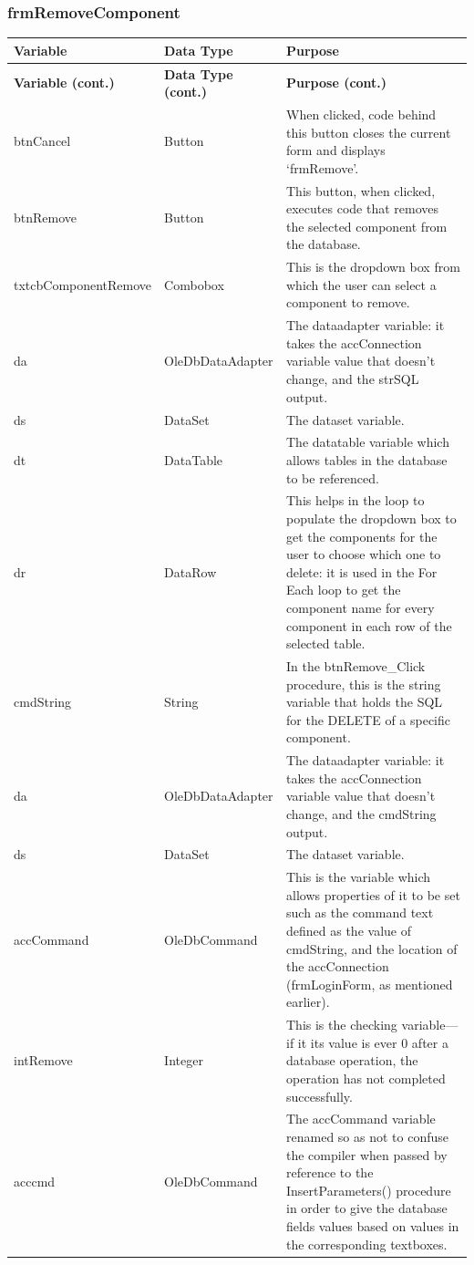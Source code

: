 	\subsubsection{frmRemoveComponent}
	\begin{longtable}{| p{4cm} | p{3cm} | p{10cm} |}
		\hline
		\textbf{Variable} & \textbf{Data Type} & \textbf{Purpose}\\
		\endfirsthead
		\hline
		\textbf{Variable (cont.)} & \textbf{Data Type (cont.)} & \textbf{Purpose (cont.)}\\
		\endhead
		\hline
		btnCancel & Button & When clicked, code behind this button closes the current form and displays `frmRemove'.\\
		\hline
		btnRemove & Button & This button, when clicked, executes code that removes the selected component from the database.\\
		\hline
		txtcbComponentRemove & Combobox & This is the dropdown box from which the user can select a component to remove.\\
		\hline
		da & OleDbDataAdapter & The dataadapter variable: it takes the accConnection variable value that doesn't change, and the strSQL output.\\
		\hline
		ds & DataSet & The dataset variable.\\
		\hline
		dt & DataTable & The datatable variable which allows tables in the database to be referenced.\\
		\hline
		dr & DataRow & This helps in the loop to populate the dropdown box to get the components for the user to choose which one to delete: it is used in the For Each loop to get the component name for every component in each row of the selected table.\\
		\hline
		cmdString & String & In the btnRemove\_Click procedure, this is the string variable that holds the SQL for the DELETE of a specific component.\\
		\hline
		da & OleDbDataAdapter & The dataadapter variable: it takes the accConnection variable value that doesn't change, and the cmdString output.\\
		\hline
		ds & DataSet & The dataset variable.\\
		\hline
		accCommand & OleDbCommand & This is the variable which allows properties of it to be set such as the command text defined as the value of cmdString, and the location of the accConnection (frmLoginForm, as mentioned earlier).\\
		\hline
		intRemove & Integer & This is the checking variable---if it its value is ever 0 after a database operation, the operation has not completed successfully.\\
		\hline
		acccmd & OleDbCommand & The accCommand variable renamed so as not to confuse the compiler when passed by reference to the InsertParameters() procedure in order to give the database fields values based on values in the corresponding textboxes.\\
		\hline
	\end{longtable}
	
